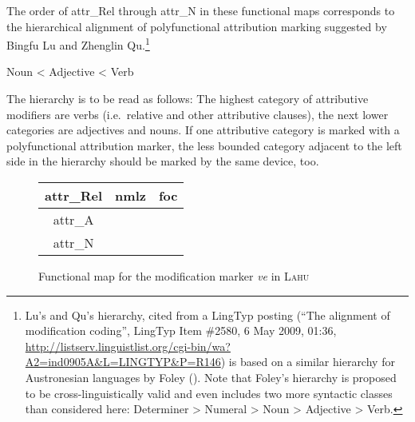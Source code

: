 The order of {\sc attr}_{Rel} through {\sc attr}_{N} in these functional maps corresponds to the hierarchical alignment of polyfunctional attribution marking suggested by Bingfu Lu and Zhenglin Qu.\footnote{Lu's and Qu's hierarchy, cited from a LingTyp posting (“The alignment of modification coding”, LingTyp Item \#2580, 6 May 2009, 01:36, \url{http://listserv.linguistlist.org/cgi-bin/wa?A2=ind0905A&L=LINGTYP&P=R146}) is based on a similar hierarchy for Austronesian languages by Foley (\citeyear{foley1980}). Note that Foley's hierarchy is proposed to be cross-linguistically valid and even includes two more syntactic classes than considered here: Determiner > Numeral > Noun > Adjective > Verb.}
\begin{exe}
\ex	Noun < Adjective < Verb
\end{exe}
The hierarchy is to be read as follows: The highest category of attributive modifiers are verbs (i.e.~relative and other attributive clauses), the next lower categories are adjectives and nouns. If one attributive category is marked with a polyfunctional attribution marker, the less bounded category adjacent to the left side in the hierarchy should be marked by the same device, too.

\begin{figure}[htbp]
\parbox[b]{\textwidth}{
\begin{center}
\begin{tabular}{| c || c | c |}
\cline{1-1}
\\
\hline
{\sc attr}_{Rel} & {\sc nmlz} & {\sc foc}\\
\hline
{\sc attr}_{A}\\
\cline{1-1}
{\sc attr}_{N}\\
\cline{1-1}
\end{tabular}
\end{center}
}
\caption[Functional map for modification marking]{Functional map for the modification marker \textit{ve} in \textsc{Lahu}}
\label{lahu funcmap}
\end{figure}

